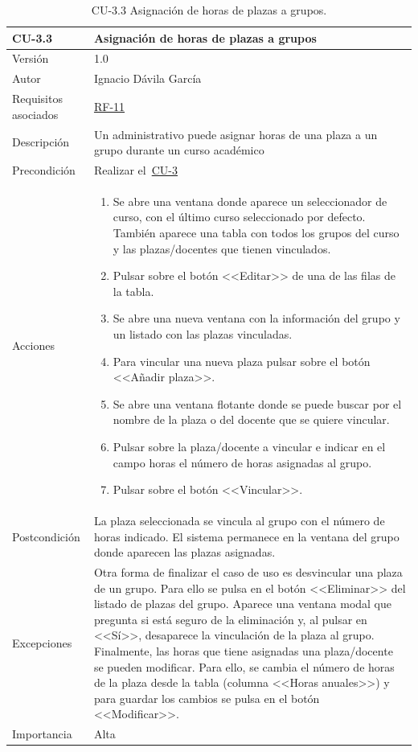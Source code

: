 \begin{table}[p]
	\centering
	\begin{tabularx}{\linewidth}{ p{} p{} }
		\toprule
		\textbf{CU-3.3}    & \textbf{Asignación de horas de plazas a grupos}\\
		\toprule
		{\small Versión}              & 1.0    \\
		{\small Autor}                & Ignacio Dávila García \\
		{\small Requisitos asociados} & \hyperref[itm:RF11]{RF-11} \\
		{\small Descripción}          & Un administrativo puede asignar horas de una plaza a un grupo durante un curso académico \\
		{\small Precondición}         & Realizar el~\hyperref[table:CU-3]{CU-3} \\
		{\small Acciones}             &
		\begin{enumerate}
			\def\labelenumi{\arabic{enumi}.}
			\tightlist
			\item Se abre una ventana donde aparece un seleccionador de curso, con el último curso seleccionado por defecto. También aparece una tabla con todos los grupos del curso y las plazas/docentes que tienen vinculados.
			\item Pulsar sobre el botón <<Editar>> de una de las filas de la tabla.
			\item Se abre una nueva ventana con la información del grupo y un listado con las plazas vinculadas.
			\item Para vincular una nueva plaza pulsar sobre el botón <<Añadir plaza>>.
			\item Se abre una ventana flotante donde se puede buscar por el nombre de la plaza o del docente que se quiere vincular.
			\item Pulsar sobre la plaza/docente a vincular e indicar en el campo horas el número de horas asignadas al grupo.
			\item Pulsar sobre el botón <<Vincular>>.
		\end{enumerate}\\
		{\small Postcondición}        & La plaza seleccionada se vincula al grupo con el número de horas indicado. El sistema permanece en la ventana del grupo donde aparecen las plazas asignadas. \\
		{\small Excepciones}          & Otra forma de finalizar el caso de uso es desvincular una plaza de un grupo. Para ello se pulsa en el botón <<Eliminar>> del listado de plazas del grupo. Aparece una ventana modal que pregunta si está seguro de la eliminación y, al pulsar en <<Sí>>, desaparece la vinculación de la plaza al grupo.
		Finalmente, las horas que tiene asignadas una plaza/docente se pueden modificar. Para ello, se cambia el número de horas de la plaza desde la tabla (columna <<Horas anuales>>) y para guardar los cambios se pulsa en el botón <<Modificar>>. \\
		{\small Importancia}          & Alta \\
		\bottomrule
	\end{tabularx}
	\caption{CU-3.3 Asignación de horas de plazas a grupos.}\label{table:CU-3_3}
\end{table}
\FloatBarrier

